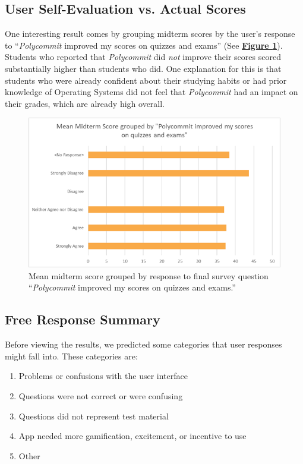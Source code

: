 \subsection{User Self-Evaluation vs. Actual Scores}

\par One interesting result comes by grouping midterm scores by the user's response to ``\textit{Polycommit} improved my scores on quizzes and exams'' (See \textbf{\hyperref[fig:overconfidence]{Figure \ref*{fig:overconfidence}}}). Students who reported that \textit{Polycommit} did \textit{not} improve their scores scored substantially higher than students who did. One explanation for this is that students who were already confident about their studying habits or had prior knowledge of Operating Systems did not feel that \textit{Polycommit} had an impact on their grades, which are already high overall.

\begin{figure}[h]
	\includegraphics[width=1.0\linewidth]{figures/improved-vs-score}
	\caption{Mean midterm score grouped by response to final survey question ``\textit{Polycommit} improved my scores on quizzes and exams.''}
	\label{fig:overconfidence}
\end{figure}


\subsection{Free Response Summary}
\par Before viewing the results, we predicted some categories that user responses might fall into. These categories are:

\begin{enumerate}
	\item Problems or confusions with the user interface
	\item Questions were not correct or were confusing
	\item Questions did not represent test material
	\item App needed more gamification, excitement, or incentive to use
	\item Other
\end{enumerate}

